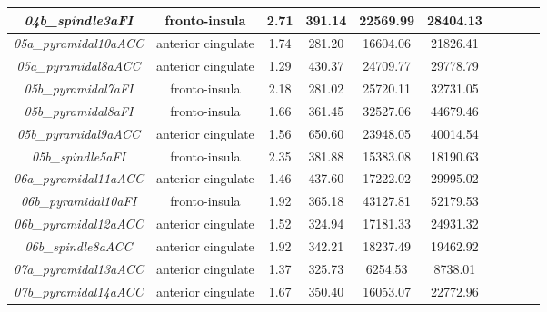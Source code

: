 \begin{longtable}{|c|c|c|c|c|c|c|c|c|c|}
	\textit{04b\_spindle3aFI}     & fronto-insula      & 2.71                      & 391.14                    & 22569.99                  & 28404.13                  \\ \hline
	\textit{05a\_pyramidal10aACC} & anterior cingulate & 1.74                      & 281.20                    & 16604.06                  & 21826.41                  \\ \hline
	\textit{05a\_pyramidal8aACC}  & anterior cingulate & 1.29                      & 430.37                    & 24709.77                  & 29778.79                  \\ \hline
	\textit{05b\_pyramidal7aFI}   & fronto-insula      & 2.18                      & 281.02                    & 25720.11                  & 32731.05                  \\ \hline
	\textit{05b\_pyramidal8aFI}   & fronto-insula      & 1.66                      & 361.45                    & 32527.06                  & 44679.46                  \\ \hline
	\textit{05b\_pyramidal9aACC}  & anterior cingulate & 1.56                      & 650.60                    & 23948.05                  & 40014.54                  \\ \hline
	\textit{05b\_spindle5aFI}     & fronto-insula      & 2.35                      & 381.88                    & 15383.08                  & 18190.63                  \\ \hline
	\textit{06a\_pyramidal11aACC} & anterior cingulate & 1.46                      & 437.60                    & 17222.02                  & 29995.02                  \\ \hline
	\textit{06b\_pyramidal10aFI}  & fronto-insula      & 1.92                      & 365.18                    & 43127.81                  & 52179.53                  \\ \hline
	\textit{06b\_pyramidal12aACC} & anterior cingulate & 1.52                      & 324.94                    & 17181.33                  & 24931.32                  \\ \hline
	\textit{06b\_spindle8aACC}    & anterior cingulate & 1.92                      & 342.21                    & 18237.49                  & 19462.92                  \\ \hline
	\textit{07a\_pyramidal13aACC} & anterior cingulate & 1.37                      & 325.73                    & 6254.53                   & 8738.01                   \\ \hline
	\textit{07b\_pyramidal14aACC} & anterior cingulate & 1.67                      & 350.40                    & 16053.07                  & 22772.96                  \\ \hline

\end{longtable}
